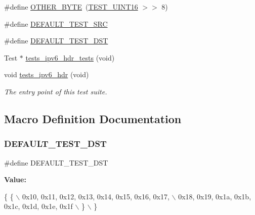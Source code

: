 \begin{DoxyCompactItemize}
\item 
\#define \hyperlink{tests-ipv6__hdr_8c_aeb431b9770aa6eb0d3993bed4b5ede02}{O\+T\+H\+E\+R\+\_\+\+B\+Y\+TE}~(\hyperlink{unittests-constants_8h_ada84310dd4f52d94096d5baed5eb75e1}{T\+E\+S\+T\+\_\+\+U\+I\+N\+T16} $>$$>$ 8)
\item 
\#define \hyperlink{tests-ipv6__hdr_8c_aa4c51543e0d0fa390349bc4655d74639}{D\+E\+F\+A\+U\+L\+T\+\_\+\+T\+E\+S\+T\+\_\+\+S\+RC}
\item 
\#define \hyperlink{tests-ipv6__hdr_8c_af036f8b203b4e892d3552d3ba77849d0}{D\+E\+F\+A\+U\+L\+T\+\_\+\+T\+E\+S\+T\+\_\+\+D\+ST}
\item 
Test $\ast$ \hyperlink{tests-ipv6__hdr_8c_a0004de43e2620b11aa446d616e0724e9}{tests\+\_\+ipv6\+\_\+hdr\+\_\+tests} (void)
\item 
void \hyperlink{group__unittests_ga24225364efd039f0cdd38e4286bed7c5}{tests\+\_\+ipv6\+\_\+hdr} (void)
\begin{DoxyCompactList}\small\item\em The entry point of this test suite. \end{DoxyCompactList}\end{DoxyCompactItemize}


\subsection{Macro Definition Documentation}
\mbox{\label{tests-ipv6__hdr_8c_af036f8b203b4e892d3552d3ba77849d0}} 
\subsubsection{\texorpdfstring{D\+E\+F\+A\+U\+L\+T\+\_\+\+T\+E\+S\+T\+\_\+\+D\+ST}{DEFAULT\_TEST\_DST}}
{\footnotesize\ttfamily \#define D\+E\+F\+A\+U\+L\+T\+\_\+\+T\+E\+S\+T\+\_\+\+D\+ST}

{\bfseries Value\+:}
\begin{DoxyCode}
\{ \{ \(\backslash\)
            0x10, 0x11, 0x12, 0x13, 0x14, 0x15, 0x16, 0x17, \(\backslash\)
            0x18, 0x19, 0x1a, 0x1b, 0x1c, 0x1d, 0x1e, 0x1f \(\backslash\)
        \} \(\backslash\)
    \}
\end{DoxyCode}
\mbox{\label{tests-ipv6__hdr_8c_aa4c51543e0d0fa390349bc4655d74639}} 
